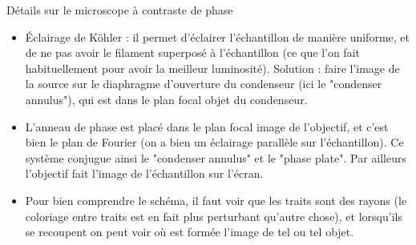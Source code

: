 \begin{remarques} Détails sur le microscope à contraste de phase
\begin{itemize}
\item Éclairage de Köhler : il permet d’éclairer l’échantillon de manière uniforme, et de ne pas avoir le filament superposé à l’échantillon (ce que l’on fait habituellement pour avoir la meilleur luminosité). Solution : faire l’image de la source sur le diaphragme d’ouverture du condenseur (ici le "condenser annulus"), qui est dans le plan focal objet du condenseur.
\item L'anneau de phase est placé dans le plan focal image de l’objectif, et c’est bien le plan de Fourier (on a bien un éclairage parallèle sur l’échantillon). Ce système conjugue ainsi le "condenser annulus" et le "phase plate". Par ailleurs l’objectif fait l’image de l’échantillon sur l’écran.
\item Pour bien comprendre le schéma, il faut voir que les traits sont des rayons (le coloriage entre traits est en fait plus perturbant qu’autre chose), et lorsqu’ils se recoupent on peut voir où est formée l’image de tel ou tel objet.
\end{itemize}
\end{remarques}








